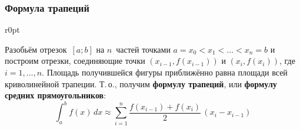 \subsubsection{Формула трапеций}
\begin{wrapfigure}[6]{r}{0pt}
\noindent
{}
\end{wrapfigure}
 Разобьём отрезок~$[a; b]$ на $n$~частей точками $a = x_0 < x_1 < \ldots < x_n = b$ и построим отрезки, соединяющие точки $(x_{i-1}, f(x_{i-1}))$ и $(x_i, f(x_i))$, где $i = 1, \ldots, n$.
Площадь получившейся фигуры приближённо равна площади всей криволинейной трапеции.
Т.\,о., получим \textbf{формулу трапеций}, или \textbf{формулу средних прямоугольников}:
\begin{equation*}
\int_a^b f(x)\,dx \approx \sum_{i=1}^n \frac{f(x_{i-1}) + f(x_i)}2\,(x_i - x_{i-1})
\end{equation*}